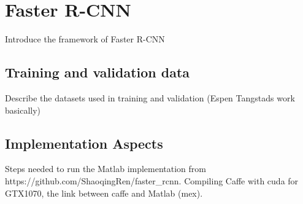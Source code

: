 \section{Faster R-CNN}
Introduce the framework of Faster R-CNN
\subsection{Training and validation data}
Describe the datasets used in training and validation (Espen Tangstads work basically)
\subsection{Implementation Aspects}
Steps needed to run the Matlab implementation from https://github.com/ShaoqingRen/faster\_rcnn. Compiling Caffe with cuda for GTX1070, the link between caffe and Matlab (mex).
